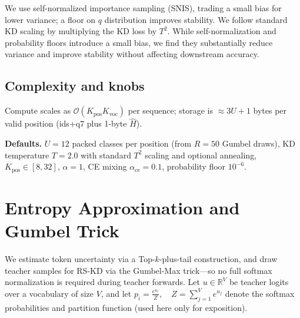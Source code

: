 \documentclass[11pt]{article}
\begin{document}
We use self-normalized importance sampling (SNIS), trading a small bias for lower variance; a floor on $q$ distribution improves stability.
We follow standard KD scaling by multiplying the KD loss by $T^2$. While self-normalization and probability floors introduce a small bias, we find they substantially reduce variance and improve stability without affecting downstream accuracy.

\subsection{Complexity and knobs}
Compute scales as $\mathcal{O}(K_{\text{pos}}K_{\text{voc}})$ per sequence; storage is $\approx 3U + 1$ bytes per valid position (ids+q7 plus 1-byte $\hat H$).

\noindent\textbf{Defaults.} $U{=}12$ packed classes per position (from $R{=}50$ Gumbel draws), KD temperature $T{=}2.0$ with standard $T^2$ scaling and optional annealing, $K_{\text{pos}}\!\in\![8,32]$, $\alpha{=}1$, CE mixing $\alpha_{\text{ce}}{=}0.1$, probability floor $10^{-6}$.

\section{Entropy Approximation and Gumbel Trick}
\label{sec:entropy}
We estimate token uncertainty via a Top-$k$-plus-tail construction, and draw teacher samples for RS-KD via the Gumbel-Max trick—so no full softmax normalization is required during teacher forwards.
Let $u \in \mathbb{R}^V$ be teacher logits over a vocabulary of size $V$, and let
$
	p_i=\frac{e^{u_i}}{Z},\quad Z=\sum_{j=1}^V e^{u_j}
$
denote the softmax probabilities and partition function (used here only for exposition).
\end{document}
